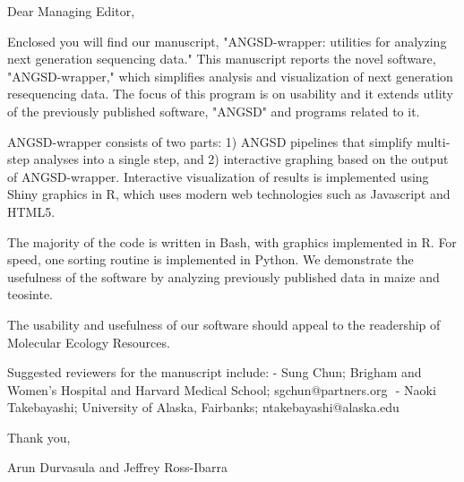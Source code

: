 Dear Managing Editor,

Enclosed you will find our manuscript, "ANGSD-wrapper: utilities for analyzing next generation sequencing data." This manuscript reports the novel software, "ANGSD-wrapper," which simplifies analysis and visualization of next generation resequencing data. The focus of this program is on usability and it extends utlity of the previously published software, "ANGSD" and programs related to it.

ANGSD-wrapper consists of two parts: 1) ANGSD pipelines that simplify multi-step analyses into a single step, and 2) interactive graphing based on the output of ANGSD-wrapper. Interactive visualization of results is implemented using Shiny graphics in R, which uses modern web technologies such as Javascript and HTML5. 

The majority of the code is written in Bash, with graphics implemented in R. For speed, one sorting routine is implemented in Python.
We demonstrate the usefulness of the software by analyzing previously published data in maize and teosinte. 

The usability and usefulness of our software should appeal to the readership of Molecular Ecology Resources.

Suggested reviewers for the manuscript include:
	- Sung Chun; Brigham and Women’s Hospital and Harvard Medical School; sgchun@partners.org 
	- Naoki Takebayashi; University of Alaska, Fairbanks; ntakebayashi@alaska.edu
	

Thank you,

Arun Durvasula and Jeffrey Ross-Ibarra